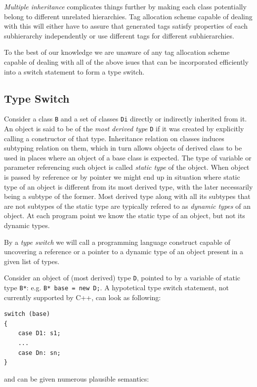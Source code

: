 \documentclass[preprint]{sigplanconf}
\makeatletter
\DeclareRobustCommand{\code}[1]{{\lstinline[breaklines=false,escapechar=@]{#1}}}
\makeatother
\begin{document}
\emph{Multiple inheritance} complicates things further by making each class 
potentially belong to different unrelated hierarchies. Tag allocation scheme 
capable of dealing with this will either have to assure that generated tags 
satisfy properties of each subhierarchy independently or use different tags for 
different subhierarchies.

To the best of our knowledge we are unaware of any tag allocation scheme capable 
of dealing with all of the above isues that can be incorporated efficiently into  
a switch statement to form a type switch.

\subsection{Type Switch}

Consider a class \code{B} and a set of classes \code{Di} directly or indirectly 
inherited from it. An object is said to be of the \emph{most derived type} 
\code{D} if it was created by explicitly calling a constructor of that type.
Inheritance relation on classes induces subtyping relation on them, which in 
turn allows objects of derived class to be used in places where an object of a 
base class is expected. The type of variable or parameter referencing such 
object is called \emph{static type} of the object. When object is passed by 
reference or by pointer we might end up in situation where static type of an 
object is different from its most derived type, with the later necessarily 
being a subtype of the former. Most derived type along with all its subtypes 
that are not subtypes of the static type are typically refered to as 
\emph{dynamic types} of an object. At each program point we know the static type 
of an object, but not its dynamic types.

By a \emph{type switch} we will call a programming language construct capable of 
uncovering a reference or a pointer to a dynamic type of an object present in a 
given list of types.

Consider an object of (most derived) type \code{D}, pointed to by a variable of 
static type \code{B*}: e.g. \code{B* base = new D;}. A hypotetical type switch 
statement, not currently supported by C++, can look as following:

\begin{lstlisting}
switch (base)
{
    case D1: s1;
    ...
    case Dn: sn;
}
\end{lstlisting}

\noindent and can be given numerous plausible semantics:
\end{document}
